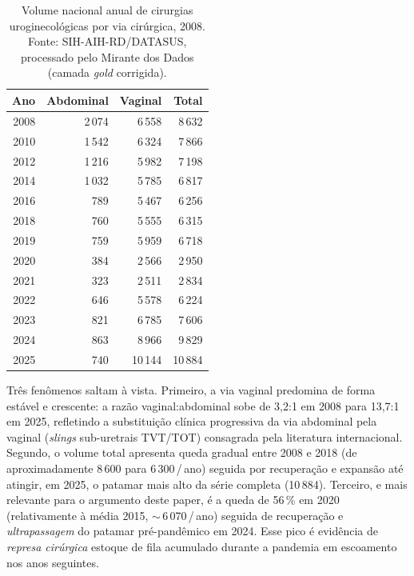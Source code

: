 \documentclass[12pt,a4paper,oneside]{article}
\begin{document}
\begin{table}[H]
\centering
\caption{Volume nacional anual de cirurgias uroginecológicas por
via cirúrgica, 2008. Fonte: SIH-AIH-RD/DATASUS,
processado pelo Mirante dos Dados (camada \textit{gold} corrigida).}
\label{tab:nat-aih}
\small
\begin{tabular}{rrrr}
\toprule
\textbf{Ano} & \textbf{Abdominal} & \textbf{Vaginal} & \textbf{Total} \\
\midrule
2008 & 2\,074 & 6\,558  & 8\,632 \\
2010 & 1\,542 & 6\,324  & 7\,866 \\
2012 & 1\,216 & 5\,982  & 7\,198 \\
2014 & 1\,032 & 5\,785  & 6\,817 \\
2016 &   789  & 5\,467  & 6\,256 \\
2018 &   760  & 5\,555  & 6\,315 \\
2019 &   759  & 5\,959  & 6\,718 \\
2020 &   384  & 2\,566  & 2\,950 \\
2021 &   323  & 2\,511  & 2\,834 \\
2022 &   646  & 5\,578  & 6\,224 \\
2023 &   821  & 6\,785  & 7\,606 \\
2024 &   863  & 8\,966  & 9\,829 \\
2025 &   740  & 10\,144 & 10\,884 \\
\bottomrule
\end{tabular}
\end{table}

Três fenômenos saltam à vista. Primeiro, a via vaginal predomina
de forma estável e crescente: a razão vaginal:abdominal sobe de
3{,}2:1 em 2008 para 13{,}7:1 em 2025, refletindo a substituição
clínica progressiva da via abdominal pela vaginal (\textit{slings}
sub-uretrais TVT/TOT) consagrada pela literatura
internacional. Segundo, o volume total apresenta queda gradual
entre 2008 e 2018 (de aproximadamente 8\,600 para 6\,300\,/\,ano)
seguida por recuperação e expansão até atingir, em 2025, o
patamar mais alto da série completa (10\,884). Terceiro, e mais
relevante para o argumento deste paper, é a queda de 56\,\% em
2020 (relativamente à média
2015, $\sim$\,6\,070\,/\,ano) seguida de
recuperação e \textit{ultrapassagem} do patamar pré-pandêmico
em 2024. Esse pico é evidência de \textit{represa
cirúrgica} \textemdash{} estoque de fila acumulado durante a
pandemia em escoamento nos anos seguintes.
\end{document}
